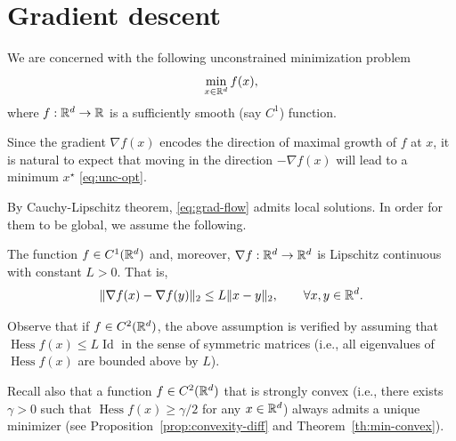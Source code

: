 \documentclass{report}
\begin{document}
\section{Gradient descent}

We are concerned with the following unconstrained minimization problem 
\begin{equation}
	\label{eq:unc-opt}
	\min_{x\in\mathbb{R}^d} f(x),
\end{equation}
where $f:\mathbb{R}^d\to \mathbb{R}$ is a sufficiently smooth (say $C^1$) function.

Since the gradient $\nabla f(x)$ encodes the direction of maximal growth of $f$ at $x$, it is natural to expect that moving in the direction $-\nabla f(x)$ will lead to a minimum $x^\star$ \eqref{eq:unc-opt}. 


By Cauchy-Lipschitz theorem, \eqref{eq:grad-flow} admits local solutions. 
In order for them to be global, we assume the following.

\begin{assumption}
	\label{ass:grad-lip}
	The function $f\in C^{1}(\mathbb{R}^d)$ and, moreover, $\nabla f:\mathbb{R}^d\to \mathbb{R}^d$ is Lipschitz continuous with constant $L>0$. That is,
	\begin{equation}
		\label{eq:grad-lip}
		\|\nabla f(x)-\nabla f(y)\|_2 \le L \|x-y\|_2,\qquad \forall x,y\in\mathbb{R}^d.
	\end{equation}
\end{assumption}

Observe that if $f\in C^2(\mathbb{R}^d)$, the above assumption is verified by assuming that $\operatorname{Hess} f(x)\le L \operatorname{Id}$ in the sense of symmetric matrices (i.e.,  all eigenvalues of $\operatorname{Hess}f(x)$ are bounded above by $L$).

Recall also that a function $f\in C^2(\mathbb{R}^d)$ that is strongly convex (i.e., there exists $\gamma>0$ such that $\operatorname{Hess}f(x)\ge \gamma/2$ for any $x\in \mathbb{R}^d$) always admits a unique minimizer (see Proposition~\ref{prop:convexity-diff} and Theorem~\ref{th:min-convex}).

\end{document}
